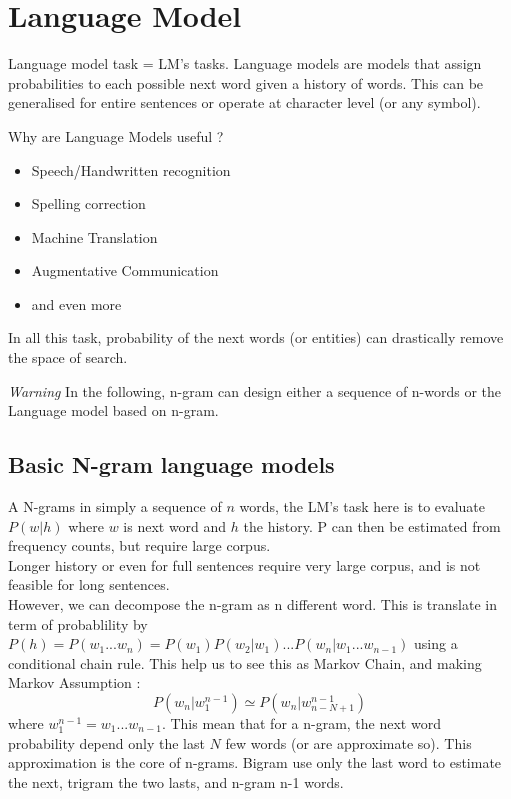 	\section{Language Model}

		Language model task = LM's tasks.
		Language models are models that assign probabilities to each possible next word given a history of words. This can be generalised for entire sentences or operate at character level (or any symbol).

		Why are Language Models useful ? 
		\begin{itemize}
			\item Speech/Handwritten recognition
			\item Spelling correction
			\item Machine Translation
			\item Augmentative Communication
			\item and even more
		\end{itemize}

		In all this task, probability of the next words (or entities) can drastically remove the space of search. 

		\emph{Warning} In the following, n-gram can design either a sequence of n-words or the Language model based on n-gram.

		\subsection{Basic N-gram language models}

				A N-grams in simply a sequence of $n$ words, the LM's task here is to evaluate $P(w|h)$ where $w$ is next word and $h$ the history. P can then be estimated from frequency counts, but require large corpus.\\
				Longer history or even for full sentences require very large corpus, and is not feasible for long sentences.\\
				However, we can decompose the n-gram as n different word. This is translate in term of probablility by $P(h) = P(w_1 ... w_n) = P(w_1)P(w_2 | w_1)...P(w_n | w_1 ... w_{n-1})$ using a conditional chain rule. This help us to see this as Markov Chain, and making Markov Assumption : 
				\[
					P(w_n | w_1^{n-1}) \simeq P(w_n | w_{n-N+1}^{n-1})
				\]
				where $w_1^{n-1} = w_1 ... w_{n-1}$. This mean that for a n-gram, the next word probability depend only the last $N$ few words (or are approximate so). This approximation is the core of n-grams. 
				Bigram use only the last word to estimate the next, trigram the two lasts, and n-gram n-1 words.

